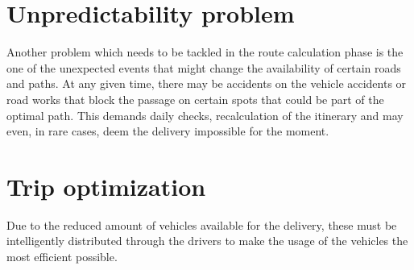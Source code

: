 \section{Unpredictability problem}
Another problem which needs to be tackled in the route calculation phase is the one of the unexpected events that might change the availability of certain roads and paths. At any given time, there may be accidents on the vehicle accidents or road works that block the passage on certain spots that could be part of the optimal path. This demands daily checks, recalculation of the itinerary and may even, in rare cases, deem the delivery impossible for the moment.


\section{Trip optimization}
Due to the reduced amount of vehicles available for the delivery, these must be intelligently distributed through the drivers to make the usage of the vehicles the most efficient possible.